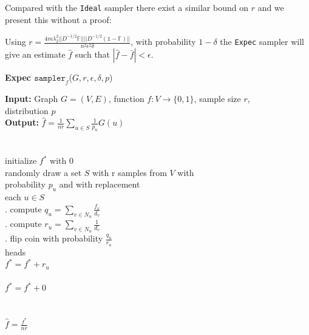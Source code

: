 Compared with the \texttt{Ideal} sampler there exist a similar bound on $r$ and we present this without a proof:
\begin{theorem}
Using $r = \frac{4m\lambda_2^2||D^{-1/2}\mathds{F}||||D^{-1/2}(\mathds{1}-\mathds{F})||}{n^2\epsilon^2\delta}$, with probability $1-\delta$ the \texttt{Expec} sampler will give an estimate $\hat{f}$ such that $|\hat{f}-\bar{f}|< \epsilon$.  
\end{theorem}
\begin{algorithm*}[!htb]
\caption{\small {\bf Expec $\texttt{sampler}_f$}($G, r, \epsilon, \delta, p$)}
\begin{code}
{\bf Input:} Graph $G=(V,E)$, function $f : V \rightarrow \{0,1\}$, sample size $r$,\\ distribution $p$ \\
{\bf Output:} $\hat{f}=\frac{1}{nr}\sum\nolimits_{u\in S}\frac{1}{p_u}G(u)$\\
\\
\uln \>\ubegin\\
\uln \>\>initialize $f^*$ with 0 \\
\uln \>\>randomly draw a set $S$ with r samples from $V$ with\\
\>   \>\>\>probability $p_u$ and with replacement\\
\uln \>\>\ufor each $u \in S$ \udo\\
\uln \>\>. compute $q_u = \sum_{v\in N_u}\frac{f_v}{d_v}$\\
\>   \>\>. compute $r_u = \sum_{v\in N_u}\frac{1}{d_v}$\\
\>   \>\>. flip coin with probability $\frac{q_u}{r_u}$\\
\uln \>\>\>\uif heads\\
\uln \>\>\>\>$f^* = f^* + r_u$ \\
\uln \>\>\>\uelse\\
\uln \>\>\>\>$f^* = f^* + 0$ \\
\uln \>\>\>\uend\\
\uln \>\>\uend\\
\uln \>\ureturn $\hat{f} = \frac{f^*}{nr}$ \\
\uln \>\uend\\ 
\end{code}
\label{algexpec}
\end{algorithm*}
